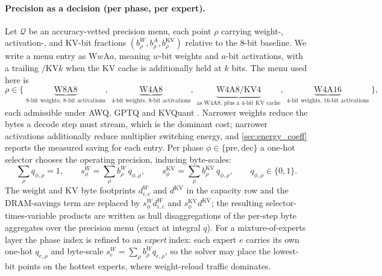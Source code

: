 \paragraph{Precision as a decision (per phase, per expert).}
Let $\mathcal{Q}$ be an accuracy-vetted precision menu, each point $\rho$
carrying weight-, activation-, and KV-bit fractions $(b^W_\rho,b^A_\rho,
b^{\mathrm{KV}}_\rho)$ relative to the 8-bit baseline. We write a menu entry as
$\mathrm{W}w\mathrm{A}a$, meaning $w$-bit weights and $a$-bit activations, with a
trailing $/\mathrm{KV}k$ when the KV cache is additionally held at $k$ bits. The
menu used here is
\[
  \rho \in \{\;
  \underbrace{\mathrm{W8A8}}_{\text{8-bit weights, 8-bit activations}},\;
  \underbrace{\mathrm{W4A8}}_{\text{4-bit weights, 8-bit activations}},\;
  \underbrace{\mathrm{W4A8/KV4}}_{\text{as W4A8, plus a 4-bit KV cache}},\;
  \underbrace{\mathrm{W4A16}}_{\text{4-bit weights, 16-bit activations}}
  \;\},
\]
each admissible under AWQ, GPTQ and KVQuant
\citep{lin2024awq,frantar2023gptq,hooper2024kvquant}. Narrower weights reduce the
bytes a decode step must stream, which is the dominant cost; narrower activations
additionally reduce multiplier switching energy, and \cref{sec:energy_coeff}
reports the measured saving for each entry. Per phase
$\phi \in \{\mathrm{pre},\mathrm{dec}\}$ a one-hot selector chooses the operating
precision, inducing byte-scales:
\begin{equation}
\sum_{\rho} q_{\phi,\rho} = 1,\qquad
s^{W}_\phi = \sum_\rho b^W_\rho\, q_{\phi,\rho},\qquad
s^{\mathrm{KV}}_\phi = \sum_\rho b^{\mathrm{KV}}_\rho\, q_{\phi,\rho},\qquad
q_{\phi,\rho}\in\{0,1\}.
\label{eq:v3_prec}
\end{equation}
The weight and KV byte footprints $d^{W}_{i,c}$ and $d^{\mathrm{KV}}$ in the
capacity row and the DRAM-savings term are replaced by $s^{W}_{\phi}d^{W}_{i,c}$
and $s^{\mathrm{KV}}_{\phi}d^{\mathrm{KV}}$; the resulting selector-times-variable
products are written as hull disaggregations of the per-step byte aggregates
over the precision menu (exact at integral $q$). For a mixture-of-experts layer the phase index is
refined to an \emph{expert} index: each expert $e$ carries its own one-hot
$q_{e,\rho}$ and byte-scale $s^{W}_e=\sum_\rho b^W_\rho q_{e,\rho}$, so the solver
may place the lowest-bit points on the hottest experts, where weight-reload
traffic dominates.

